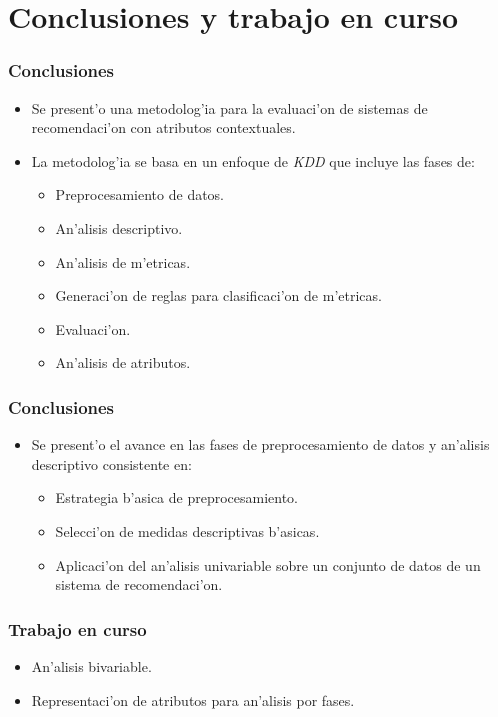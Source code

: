 \documentclass{beamer}
\begin{document}
\section{Conclusiones y trabajo en curso}
\begin{frame}[label=conclusiones1]
\frametitle{Conclusiones}
\begin{itemize}
    \setlength\itemsep{0.7cm}
    \item Se present'o una metodolog'ia para la evaluaci'on de sistemas de recomendaci'on con atributos contextuales. 
    \item La metodolog'ia se basa en un enfoque de \textit{KDD} que incluye las fases de:
    \begin{itemize}
    \setlength\itemsep{0.2cm}
    \item Preprocesamiento de datos.
    \item An'alisis descriptivo.
    \item An'alisis de m'etricas.
    \item Generaci'on de reglas para clasificaci'on de m'etricas.
    \item Evaluaci'on.
    \item An'alisis de atributos.
    \end{itemize}   
\end{itemize}
\end{frame}
\begin{frame}[label=conclusiones2]
\frametitle{Conclusiones}
\begin{itemize}
 \setlength\itemsep{0.7cm}
 \item Se present'o el avance en las fases de preprocesamiento de datos y an'alisis descriptivo consistente en:
    \begin{itemize}
    \vspace{0.3cm}
    \setlength\itemsep{0.5cm}
    \item Estrategia b'asica de preprocesamiento. 
    \item Selecci'on de medidas descriptivas b'asicas.
    \item Aplicaci'on del an'alisis univariable sobre un conjunto de datos de un sistema de recomendaci'on. 
    \end{itemize}
\end{itemize}
\end{frame}
\begin{frame}[label=tactual]
\frametitle{Trabajo en curso}
\begin{itemize}
 \setlength\itemsep{0.7cm}
 \item An'alisis bivariable.
 \item Representaci'on de atributos para an'alisis por fases.
\end{itemize}
\end{frame}
\end{document}
